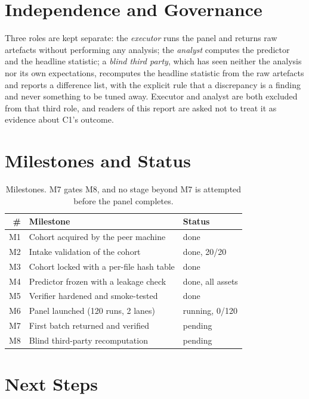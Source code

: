 \documentclass[conference]{IEEEtran}
\begin{document}
\section{Independence and Governance}
\label{sec:gov}

Three roles are kept separate: the \emph{executor} runs the panel and returns raw artefacts without
performing any analysis; the \emph{analyst} computes the predictor and the headline statistic; a
\emph{blind third party}, which has seen neither the analysis nor its own expectations, recomputes
the headline statistic from the raw artefacts and reports a difference list, with the explicit rule
that a discrepancy is a finding and never something to be tuned away. Executor and analyst are both
excluded from that third role, and readers of this report are asked not to treat it as evidence
about C1's outcome.

\section{Milestones and Status}
\label{sec:mil}

\begin{table}[!t]
\centering
\footnotesize
\begin{tabular}{@{}rlp{}@{}}
\toprule
\# & Milestone & Status \\
\midrule
M1 & Cohort acquired by the peer machine & done \\
M2 & Intake validation of the cohort & done, 20/20 \\
M3 & Cohort locked with a per-file hash table & done \\
M4 & Predictor frozen with a leakage check & done, all assets \\
M5 & Verifier hardened and smoke-tested & done \\
M6 & Panel launched (120 runs, 2 lanes) & running, 0/120 \\
M7 & First batch returned and verified & pending \\
M8 & Blind third-party recomputation & pending \\
\bottomrule
\end{tabular}
\caption{Milestones. M7 gates M8, and no stage beyond M7 is attempted before the panel completes.}
\label{tab:mil}
\end{table}

\section{Next Steps}
\label{sec:next}
\end{document}
